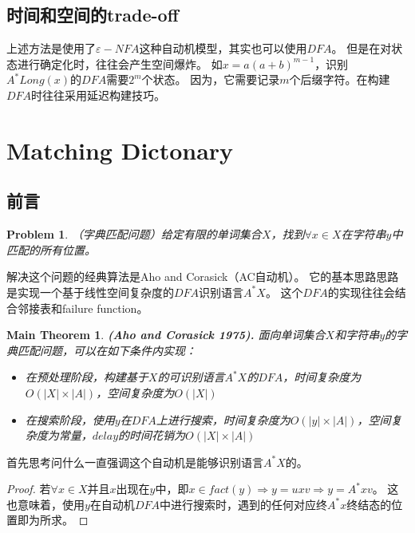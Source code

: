 \documentclass[UTF8]{ctexart}
\newtheorem{prob}[thm]{Problem}
\newtheorem{mthm}[thm]{Main Theorem}
\theoremstyle{definition}
\theoremstyle{remark}
\numberwithin{equation}{subsection}
\newcommand{\Emph}{\textbf}
\begin{document}
\subsection{时间和空间的trade-off}
	
	上述方法是使用了$\varepsilon-NFA$这种自动机模型，其实也可以使用$DFA$。
	但是在对状态进行确定化时，往往会产生空间爆炸。
	如$x = a(a+b)^{m-1}$，识别$A^*Long(x)$的$DFA$需要$2^m$个状态。
	因为，它需要记录$m$个后缀字符。在构建$DFA$时往往采用延迟构建技巧。
	

\section{Matching Dictonary}

\subsection{前言}
	
	\begin{prob}
		（字典匹配问题）给定有限的单词集合$X$，找到$\forall x \in X$在字符串$y$中匹配的所有位置。
	\end{prob}
	
	解决这个问题的经典算法是Aho and Corasick（AC自动机）。
	它的基本思路思路是实现一个基于线性空间复杂度的$DFA$识别语言$A^*X$。
	这个$DFA$的实现往往会结合邻接表和failure function。
	
	\begin{mthm}
		\Emph{(Aho and Corasick 1975).} 面向单词集合$X$和字符串$y$的字典匹配问题，可以在如下条件内实现：
		\begin{itemize}
			\item 在预处理阶段，构建基于$X$的可识别语言$A^*X$的$DFA$，时间复杂度为$O(|X|\times|A|)$，空间复杂度为$O(|X|)$
			\item 在搜索阶段，使用$y$在$DFA$上进行搜索，时间复杂度为$O(|y|\times|A|)$，空间复杂度为常量，$delay$的时间花销为$O(|X|\times|A|)$
		\end{itemize}
	\end{mthm}
	
	首先思考问什么一直强调这个自动机是能够识别语言$A^*X$的。
	\begin{proof}
		若$\forall x \in X$并且$x$出现在$y$中，即$x \in fact(y) \Rightarrow y=uxv \Rightarrow y=A^*xv$。
		这也意味着，使用$y$在自动机$DFA$中进行搜索时，遇到的任何对应终$A^*x$终结态的位置即为所求。
	\end{proof}
	
\end{document}
